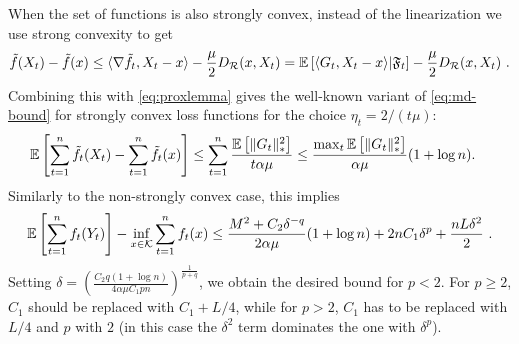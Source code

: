 When the set of functions is also strongly convex, instead of the linearization we use strong convexity to get
\[
\tilde{f}(X_t) - \tilde{f}(x) \le \langle \nabla \tilde{f}_t,X_t-x \rangle - \frac{\mu}{2} D_{\mathcal{R}}(x,X_t) = \mathbb{E}\left[\langle  G_t,X_t-x \rangle| \mathfrak{F}_t\right] - \frac{\mu}{2} D_{\mathcal{R}}(x,X_t) ~.
\]
Combining this with \eqref{eq:proxlemma} gives the well-known variant of \eqref{eq:md-bound} for strongly convex loss functions \citep{BaHaRa07} for the choice $\eta_t=2/(t\mu)$:
\begin{align*}
\mathbb{E}\left[\sum_{t=1}^n \tilde{f}_t(X_t)- \sum_{t=1}^n \tilde{f}_t(x)\right] 
& \le \sum_{t=1}^n  \frac{\mathbb{E}\left[\|G_t\|_*^2\right]}{ t \alpha \mu} \le \frac{\max_t \mathbb{E}\left[\|G_t\|_*^2\right]}{\alpha \mu} (1+\log n).
\end{align*}
Similarly to the non-strongly convex case, this implies
\begin{align}
\mathbb{E}\left[\sum_{t=1}^n f_t(Y_t)\right] - \inf_{x \in \mathcal{K}} \sum_{t=1}^n f_t(x) \le 
\frac{M^2 + C_2 \delta^{-q}}{2 \alpha \mu} (1+\log n)+  2 n C_1 \delta^{p} + \frac{n L \delta^2}{2}~.
\end{align}
Setting $\delta=(\frac{C_2 q (1+\log n)}{4 \alpha \mu C_1 p n})^{\frac{1}{p+q}}$, we obtain the desired bound for $p<2$. For $p \ge 2$, $C_1$ should be replaced with $C_1+L/4$, while for $p>2$,  $C_1$ has to be replaced with $L/4$ and $p$ with $2$ (in this case the $\delta^2$ term dominates the one with $\delta^p$).



